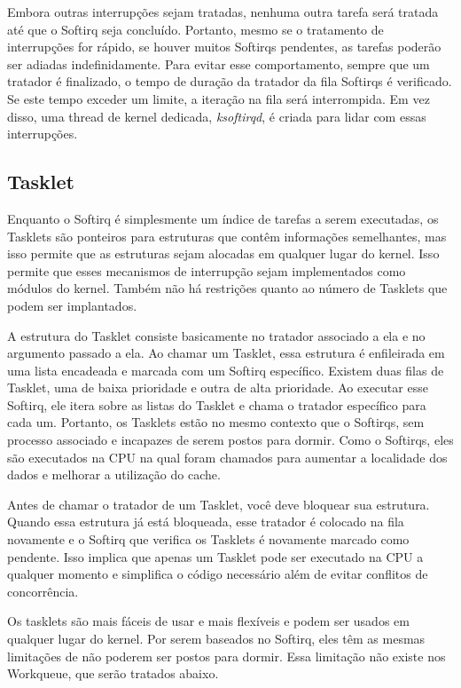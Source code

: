 Embora outras interrupções sejam tratadas, nenhuma outra tarefa será tratada até que o Softirq seja concluído. Portanto, mesmo se o tratamento de interrupções for rápido, se houver muitos Softirqs pendentes, as tarefas poderão ser adiadas indefinidamente. Para evitar esse comportamento, sempre que um tratador é finalizado, o tempo de duração da tratador da fila Softirqs é verificado. Se este tempo exceder um limite, a iteração na fila será interrompida. Em vez disso, uma thread de kernel dedicada, \textit{ksoftirqd}, é criada para lidar com essas interrupções. \cite{OReilly, Rothberg2015}

\subsection{Tasklet}

Enquanto o Softirq é simplesmente um índice de tarefas a serem executadas, os Tasklets são ponteiros para estruturas que contêm informações semelhantes, mas isso permite que as estruturas sejam alocadas em qualquer lugar do kernel. Isso permite que esses mecanismos de interrupção sejam implementados como módulos do kernel. Também não há restrições quanto ao número de Tasklets que podem ser implantados.

A estrutura do Tasklet consiste basicamente no tratador associado a ela e no argumento passado a ela. Ao chamar um Tasklet, essa estrutura é enfileirada em uma lista encadeada e marcada com um Softirq específico. Existem duas filas de Tasklet, uma de baixa prioridade e outra de alta prioridade. Ao executar esse Softirq, ele itera sobre as listas do Tasklet e chama o tratador específico para cada um. Portanto, os Tasklets estão no mesmo contexto que o Softirqs, sem processo associado e incapazes de serem postos para dormir. Como o Softirqs, eles são executados na CPU na qual foram chamados para aumentar a localidade dos dados e melhorar a utilização do cache.

Antes de chamar o tratador de um Tasklet, você deve bloquear sua estrutura. Quando essa estrutura já está bloqueada, esse tratador é colocado na fila novamente e o Softirq que verifica os Tasklets é novamente marcado como pendente. Isso implica que apenas um Tasklet pode ser executado na CPU a qualquer momento e simplifica o código necessário além de evitar conflitos de concorrência.

Os tasklets são mais fáceis de usar e mais flexíveis e podem ser usados em qualquer lugar do kernel. Por serem baseados no Softirq, eles têm as mesmas limitações de não poderem ser postos para dormir. Essa limitação não existe nos Workqueue, que serão tratados abaixo. \cite{OReilly, Rothberg2015}

